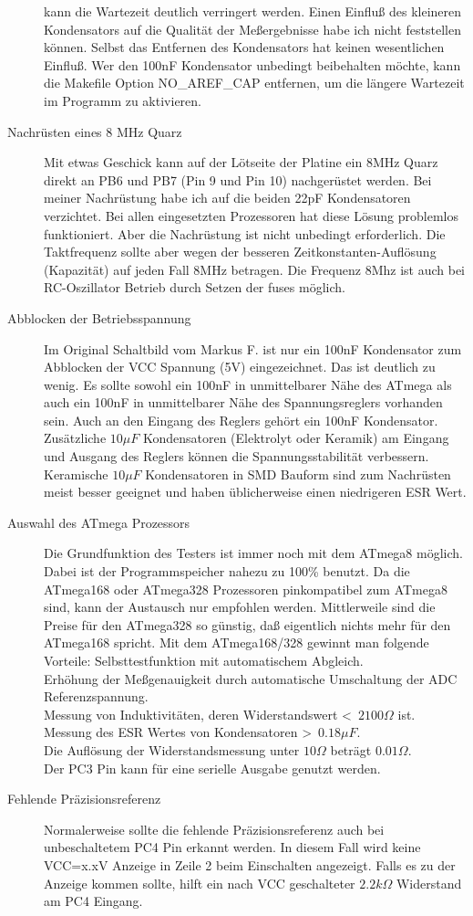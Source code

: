 \begin{description}
kann die Wartezeit deutlich verringert werden. Einen Einfluß des kleineren Kondensators
auf die Qualität der Meßergebnisse habe ich nicht feststellen können. Selbst das Entfernen
des Kondensators hat keinen wesentlichen Einfluß. Wer den 100nF Kondensator unbedingt
beibehalten möchte, kann die Makefile Option NO\_AREF\_CAP entfernen, um die längere
Wartezeit im Programm zu aktivieren.
\item[Nachrüsten eines 8 MHz Quarz]
Mit etwas Geschick kann auf der Lötseite der Platine ein 8MHz Quarz direkt an PB6 und PB7
(Pin 9 und Pin 10) nachgerüstet werden.
Bei meiner Nachrüstung habe ich auf die beiden 22pF Kondensatoren verzichtet.
Bei allen eingesetzten Prozessoren hat diese Lösung problemlos funktioniert.
Aber die Nachrüstung ist nicht unbedingt erforderlich. Die Taktfrequenz sollte aber
wegen der besseren Zeitkonstanten-Auflösung (Kapazität) auf jeden Fall 8MHz betragen.
Die Frequenz 8Mhz ist auch bei RC-Oszillator Betrieb durch Setzen der fuses möglich.
\item[Abblocken der Betriebsspannung]
Im Original Schaltbild vom Markus F. ist nur ein 100nF Kondensator zum Abblocken der
VCC Spannung (5V) eingezeichnet. Das ist deutlich zu wenig. Es sollte sowohl ein
100nF in unmittelbarer Nähe des ATmega als auch ein 100nF in unmittelbarer Nähe
des Spannungsreglers vorhanden sein. Auch an den Eingang des Reglers gehört ein
100nF Kondensator. Zusätzliche \(10\mu F\) Kondensatoren (Elektrolyt oder Keramik) am Eingang und
Ausgang des Reglers können die Spannungsstabilität verbessern. Keramische \(10\mu F\)
Kondensatoren in SMD Bauform sind zum Nachrüsten meist besser geeignet und
haben üblicherweise einen niedrigeren ESR Wert.
\item[Auswahl des ATmega Prozessors]
Die Grundfunktion des Testers ist immer noch mit dem ATmega8 möglich.
Dabei ist der Programmspeicher nahezu zu 100\% benutzt.
Da die ATmega168 oder ATmega328 Prozessoren pinkompatibel zum ATmega8 sind,
kann der Austausch nur empfohlen werden. Mittlerweile sind die Preise für
den ATmega328 so günstig, daß eigentlich nichts mehr für den ATmega168 spricht.
Mit dem ATmega168/328 gewinnt man folgende Vorteile:
Selbsttestfunktion mit automatischem Abgleich.\\
Erhöhung der Meßgenauigkeit durch automatische Umschaltung der ADC Referenzspannung.\\
Messung von Induktivitäten, deren Widerstandswert \textless~\(2100 \Omega\) ist.\\
Messung des ESR Wertes von Kondensatoren \textgreater~\(0.18 \mu F\).\\
Die Auflösung der Widerstandsmessung unter \(10 \Omega\) beträgt \(0.01 \Omega\).\\
Der PC3 Pin kann für eine serielle Ausgabe genutzt werden.
\item[Fehlende Präzisionsreferenz]
Normalerweise sollte die fehlende Präzisionsreferenz auch bei unbeschaltetem PC4 Pin
erkannt werden. In diesem Fall wird keine VCC=x.xV Anzeige in Zeile 2 beim Einschalten
angezeigt. Falls es zu der Anzeige kommen sollte, hilft ein nach VCC geschalteter 
\(2.2k \Omega\) Widerstand am PC4 Eingang.
\end{description}

